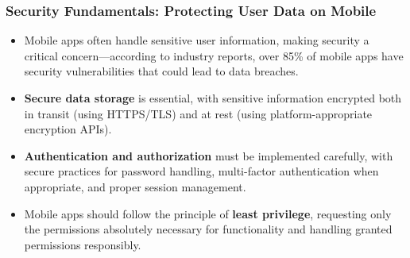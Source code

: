 \documentclass{beamer}
\begin{document}
	\begin{frame}
		\frametitle{Security Fundamentals: Protecting User Data on Mobile}
		
		\begin{itemize}
			\item Mobile apps often handle sensitive user information, making security a critical concern—according to industry reports, over 85\% of mobile apps have security vulnerabilities that could lead to data breaches.
			\item \textbf{Secure data storage} is essential, with sensitive information encrypted both in transit (using HTTPS/TLS) and at rest (using platform-appropriate encryption APIs).
			\item \textbf{Authentication and authorization} must be implemented carefully, with secure practices for password handling, multi-factor authentication when appropriate, and proper session management.
			\item Mobile apps should follow the principle of \textbf{least privilege}, requesting only the permissions absolutely necessary for functionality and handling granted permissions responsibly.
		\end{itemize}
	\end{frame}
	
\end{document}
